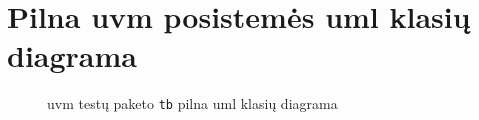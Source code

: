 
\appendix
\renewcommand{\thesection}{Priedas \arabic{section}}

\section{Pilna \gls{uvm}  posistemės \gls{uml} klasių diagrama}

\begin{figure}[H]
	
	\caption{\gls{uvm} testų paketo \texttt{tb} pilna \gls{uml} klasių diagrama}
	\label{fig:uml_class_tb_full}
\end{figure}
